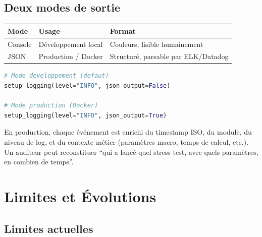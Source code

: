 \documentclass[12pt,a4paper]{article}
\begin{document}
\subsection{Deux modes de sortie}

\begin{center}
\begin{tabular}{lp{4cm}p{5cm}}
\toprule
\textbf{Mode} & \textbf{Usage} & \textbf{Format} \\
\midrule
Console & D\'eveloppement local & Couleurs, lisible humainement \\
JSON & Production / Docker & Structur\'e, parsable par ELK/Datadog \\
\bottomrule
\end{tabular}
\end{center}

\begin{lstlisting}[language=Python]
# Mode developpement (defaut)
setup_logging(level="INFO", json_output=False)

# Mode production (Docker)
setup_logging(level="INFO", json_output=True)
\end{lstlisting}

\begin{interpretbox}
En production, chaque \'ev\'enement est enrichi du timestamp ISO, du module, du niveau de log, et du contexte m\'etier (param\`etres macro, temps de calcul, etc.). Un auditeur peut reconstituer ``qui a lanc\'e quel stress test, avec quels param\`etres, en combien de temps''.
\end{interpretbox}


\section{Limites et \'Evolutions}

\subsection{Limites actuelles}
\end{document}
